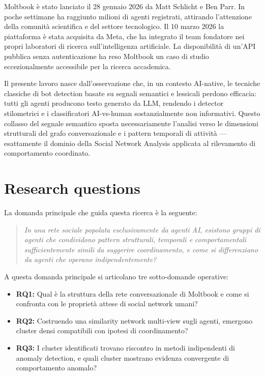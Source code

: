 \documentclass[12pt,a4paper]{report}
\begin{document}
Moltbook è stato lanciato il 28 gennaio 2026 da Matt Schlicht e Ben Parr. In poche settimane ha raggiunto milioni di agenti registrati, attirando l'attenzione della comunità scientifica e del settore tecnologico. Il 10 marzo 2026 la piattaforma è stata acquisita da Meta, che ha integrato il team fondatore nei propri laboratori di ricerca sull'intelligenza artificiale. La disponibilità di un'API pubblica senza autenticazione ha reso Moltbook un caso di studio eccezionalmente accessibile per la ricerca accademica.

Il presente lavoro nasce dall'osservazione che, in un contesto AI-native, le tecniche classiche di bot detection basate su segnali semantici e lessicali perdono efficacia: tutti gli agenti producono testo generato da LLM, rendendo i detector stilometrici e i classificatori AI-vs-human sostanzialmente non informativi. Questo collasso del segnale semantico sposta necessariamente l'analisi verso le dimensioni strutturali del grafo conversazionale e i pattern temporali di attività — esattamente il dominio della Social Network Analysis applicata al rilevamento di comportamento coordinato.

\section{Research questions}

La domanda principale che guida questa ricerca è la seguente:

\begin{quote}
\itshape
In una rete sociale popolata esclusivamente da agenti AI, esistono gruppi di agenti che condividono pattern strutturali, temporali e comportamentali sufficientemente simili da suggerire coordinamento, e come si differenziano da agenti che operano indipendentemente?
\end{quote}

A questa domanda principale si articolano tre sotto-domande operative:

\begin{itemize}
  \item \textbf{RQ1:} Qual è la struttura della rete conversazionale di Moltbook e come si confronta con le proprietà attese di social network umani?
  \item \textbf{RQ2:} Costruendo una similarity network multi-view sugli agenti, emergono cluster densi compatibili con ipotesi di coordinamento?
  \item \textbf{RQ3:} I cluster identificati trovano riscontro in metodi indipendenti di anomaly detection, e quali cluster mostrano evidenza convergente di comportamento anomalo?
\end{itemize}
\end{document}
